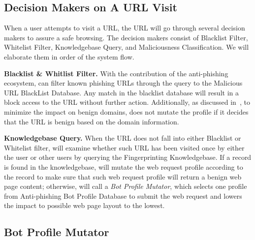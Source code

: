 \subsection{Decision Makers on A URL Visit}

When a user attempts to visit a URL, the URL will go through several decision makers to assure a safe browsing.
The decision makers consist of Blacklist Filter, Whitelist Filter, Knowledgebase Query, and Maliciousness Classification.
We will elaborate them in order of the system flow.

\noindent
\textbf{Blacklist \& Whitlist Filter.}
With the contribution of the anti-phishing ecosystem, \spartacus can filter known phishing URLs through the query to the Malicious URL BlackList Database.
Any match in the blacklist database will result in a block access to the URL without further action.
Additionally, as discussed in~, to minimize the impact on benign domains, \spartacus does not mutate the profile if it decides that the URL is benign based on the domain information.


\noindent
\textbf{Knowledgebase Query.}
When the URL does not fall into either Blacklist or Whitelist filter, \spartacus will examine whether such URL has been visited once by either the user or other users by querying the Fingerprinting Knowledgebase.
If a record is found in the knowledgebase, \spartacus will mutate the web request profile according to the record to make sure that such web request profile will return a benign web page content;
otherwise, \spartacus will call a \emph{Bot Profile Mutator}, which selects one profile from Anti-phishing Bot Profile Database to submit the web request and lowers the impact to possible web page layout to the lowest.



\subsection{Bot Profile Mutator}

